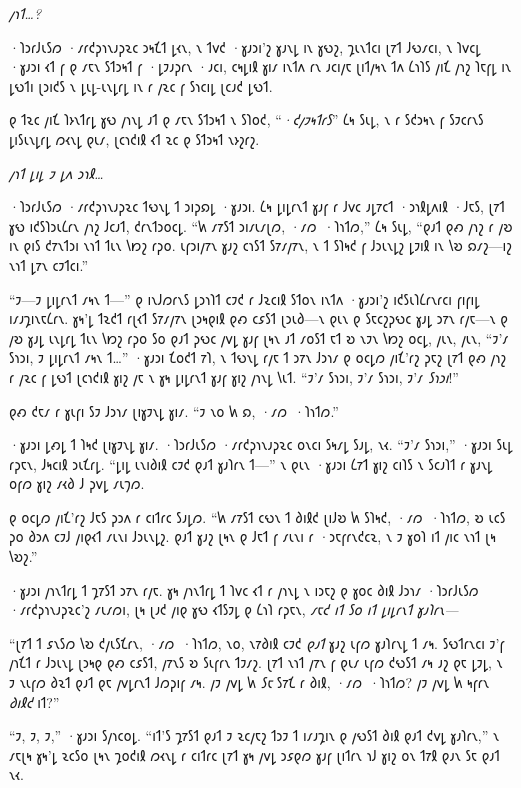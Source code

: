 \emph{𐑢𐑪𐑑…?}

·𐑐𐑮𐑩𐑓𐑧𐑕𐑼 ·𐑥𐑩𐑒𐑜𐑪𐑯𐑨𐑜𐑷𐑤 𐑮𐑰𐑗𐑑 𐑛𐑬𐑯, 𐑯 𐑑𐑫𐑒 ·𐑣𐑨𐑮𐑦'𐑟 𐑣𐑨𐑯𐑛 𐑦𐑯 𐑣𐑻𐑟, 𐑡𐑧𐑯𐑑𐑤𐑦 𐑚𐑳𐑑 𐑓𐑻𐑥𐑤𐑦, 𐑯 𐑐𐑫𐑤𐑛 ·𐑣𐑨𐑮𐑦 𐑬𐑑 𐑝 𐑞 𐑥𐑱𐑯 𐑕𐑑𐑮𐑰𐑑 𐑝 ·𐑛𐑲𐑨𐑜𐑩𐑯 ·𐑨𐑤𐑦, 𐑤𐑰𐑛𐑦𐑙 𐑣𐑦𐑥 𐑦𐑯𐑑𐑵 𐑩𐑯 𐑨𐑤𐑦𐑢𐑱 𐑚𐑦𐑑𐑢𐑰𐑯 𐑑𐑵 𐑖𐑪𐑐𐑕 𐑢𐑦𐑗 𐑢𐑪𐑟 𐑐𐑱𐑝𐑛 𐑦𐑯 𐑛𐑻𐑑𐑦 𐑚𐑮𐑦𐑒𐑕 𐑯 𐑛𐑧𐑛-𐑧𐑯𐑛𐑩𐑛 𐑦𐑯 𐑩 𐑢𐑷𐑤 𐑝 𐑕𐑪𐑤𐑦𐑛 𐑚𐑤𐑨𐑒 𐑛𐑻𐑑.

𐑞 𐑑𐑷𐑤 𐑢𐑦𐑗 𐑐𐑶𐑯𐑑𐑩𐑛 𐑣𐑻 𐑢𐑪𐑯𐑛 𐑨𐑑 𐑞 𐑥𐑱𐑯 𐑕𐑑𐑮𐑰𐑑 𐑯 𐑕𐑐𐑴𐑒, “\emph{·𐑒𐑢𐑲𐑰𐑑𐑩𐑕}” 𐑖𐑰 𐑕𐑧𐑛, 𐑯 𐑩 𐑕𐑒𐑮𐑰𐑯 𐑝 𐑕𐑲𐑤𐑩𐑯𐑕 𐑛𐑦𐑕𐑧𐑯𐑛𐑩𐑛 𐑼𐑬𐑯𐑛 𐑞𐑧𐑥, 𐑚𐑤𐑪𐑒𐑦𐑙 𐑬𐑑 𐑷𐑤 𐑞 𐑕𐑑𐑮𐑰𐑑 𐑯𐑶𐑟𐑩𐑟.

\emph{𐑢𐑪𐑑 𐑛𐑦𐑛 𐑲 𐑛𐑵 𐑮𐑪𐑙…}

·𐑐𐑮𐑩𐑓𐑧𐑕𐑼 ·𐑥𐑩𐑒𐑜𐑪𐑯𐑨𐑜𐑷𐑤 𐑑𐑻𐑯𐑛 𐑑 𐑮𐑦𐑜𐑸𐑛 ·𐑣𐑨𐑮𐑦. 𐑖𐑰 𐑛𐑦𐑛𐑩𐑯𐑑 𐑣𐑨𐑝 𐑩 𐑓𐑫𐑤 𐑨𐑛𐑳𐑤𐑑 ·𐑮𐑪𐑙𐑛𐑵𐑦𐑙 ·𐑓𐑱𐑕, 𐑚𐑳𐑑 𐑣𐑻 𐑦𐑒𐑕𐑐𐑮𐑧𐑖𐑩𐑯 𐑢𐑪𐑟 𐑓𐑤𐑨𐑑, 𐑒𐑩𐑯𐑑𐑮𐑴𐑤𐑛. “𐑿 𐑥𐑳𐑕𐑑 𐑮𐑦𐑥𐑧𐑥𐑚𐑼, ·𐑥𐑼~·𐑐𐑪𐑑𐑼,” 𐑖𐑰 𐑕𐑧𐑛, “𐑞𐑨𐑑 𐑞𐑺 𐑢𐑪𐑟 𐑩 𐑢𐑹 𐑦𐑯 𐑞𐑦𐑕 𐑒𐑳𐑯𐑑𐑮𐑦 𐑯𐑪𐑑 𐑑𐑧𐑯 𐑘𐑽𐑟 𐑩𐑜𐑴. 𐑧𐑝𐑮𐑦𐑢𐑳𐑯 𐑣𐑨𐑟 𐑤𐑪𐑕𐑑 𐑕𐑳𐑥𐑢𐑳𐑯, 𐑯 𐑑 𐑕𐑐𐑰𐑒 𐑝 𐑓𐑮𐑧𐑯𐑛𐑟 𐑛𐑲𐑦𐑙 𐑦𐑯 𐑘𐑹 𐑸𐑥𐑟—𐑦𐑟 𐑯𐑪𐑑 𐑛𐑳𐑯 𐑤𐑲𐑑𐑤𐑦.”

“𐑲—𐑲 𐑛𐑦𐑛𐑩𐑯𐑑 𐑥𐑰𐑯 𐑑—” 𐑞 𐑦𐑯𐑓𐑼𐑩𐑯𐑕 𐑛𐑮𐑪𐑐𐑑 𐑤𐑲𐑒 𐑩 𐑓𐑷𐑤𐑦𐑙 𐑕𐑑𐑴𐑯 𐑦𐑯𐑑𐑵 ·𐑣𐑨𐑮𐑦'𐑟 𐑦𐑒𐑕𐑧𐑐𐑖𐑩𐑯𐑩𐑤𐑦 𐑝𐑦𐑝𐑦𐑛 𐑦𐑥𐑨𐑡𐑦𐑯𐑱𐑖𐑩𐑯. 𐑣𐑰'𐑛 𐑑𐑷𐑒𐑑 𐑩𐑚𐑬𐑑 𐑕𐑳𐑥𐑢𐑳𐑯 𐑚𐑮𐑰𐑞𐑦𐑙 𐑞𐑺 𐑤𐑭𐑕𐑑 𐑚𐑮𐑧𐑔—𐑯 𐑞𐑧𐑯 𐑞 𐑕𐑱𐑤𐑟𐑜𐑻𐑤 𐑣𐑨𐑛 𐑮𐑳𐑯 𐑩𐑢𐑱—𐑯 𐑞 𐑢𐑹 𐑣𐑨𐑛 𐑧𐑯𐑛𐑩𐑛 𐑑𐑧𐑯 𐑘𐑽𐑟 𐑩𐑜𐑴 𐑕𐑴 𐑞𐑨𐑑 𐑜𐑻𐑤 𐑢𐑫𐑛 𐑣𐑨𐑝 𐑚𐑰𐑯 𐑨𐑑 𐑥𐑴𐑕𐑑 𐑱𐑑 𐑹 𐑯𐑲𐑯 𐑘𐑽𐑟 𐑴𐑤𐑛, 𐑢𐑧𐑯, 𐑢𐑧𐑯, “𐑲'𐑥 𐑕𐑪𐑮𐑦, 𐑲 𐑛𐑦𐑛𐑩𐑯𐑑 𐑥𐑰𐑯 𐑑…” ·𐑣𐑨𐑮𐑦 𐑗𐑴𐑒𐑑 𐑳𐑐, 𐑯 𐑑𐑻𐑯𐑛 𐑩𐑢𐑱 𐑑 𐑮𐑳𐑯 𐑓𐑮𐑪𐑥 𐑞 𐑴𐑤𐑛𐑼 𐑢𐑦𐑗'𐑩𐑟 𐑜𐑱𐑟 𐑚𐑳𐑑 𐑞𐑺 𐑢𐑪𐑟 𐑩 𐑢𐑷𐑤 𐑝 𐑛𐑻𐑑 𐑚𐑤𐑪𐑒𐑦𐑙 𐑣𐑦𐑟 𐑢𐑱 𐑯 𐑣𐑰 𐑛𐑦𐑛𐑩𐑯𐑑 𐑣𐑨𐑝 𐑣𐑦𐑟 𐑢𐑪𐑯𐑛 𐑘𐑧𐑑. “𐑲'𐑥 𐑕𐑪𐑮𐑦, 𐑲'𐑥 𐑕𐑪𐑮𐑦, 𐑲'𐑥 \emph{𐑕𐑪𐑮𐑦}!”

𐑞𐑺 𐑒𐑱𐑥 𐑩 𐑣𐑧𐑝𐑦 𐑕𐑲 𐑓𐑮𐑪𐑥 𐑚𐑦𐑣𐑲𐑯𐑛 𐑣𐑦𐑥. “𐑲 𐑯𐑴 𐑿 𐑸, ·𐑥𐑼~·𐑐𐑪𐑑𐑼.”

·𐑣𐑨𐑮𐑦 𐑛𐑺𐑛 𐑑 𐑐𐑰𐑒 𐑚𐑦𐑣𐑲𐑯𐑛 𐑣𐑦𐑥. ·𐑐𐑮𐑩𐑓𐑧𐑕𐑼 ·𐑥𐑩𐑒𐑜𐑪𐑯𐑨𐑜𐑷𐑤 𐑴𐑯𐑤𐑦 𐑕𐑰𐑥𐑛 𐑕𐑨𐑛, 𐑯𐑬. “𐑲'𐑥 𐑕𐑪𐑮𐑦,” ·𐑣𐑨𐑮𐑦 𐑕𐑧𐑛 𐑩𐑜𐑱𐑯, 𐑓𐑰𐑤𐑦𐑙 𐑮𐑧𐑗𐑩𐑛. “𐑛𐑦𐑛 𐑧𐑯𐑦𐑔𐑦𐑙 𐑤𐑲𐑒 𐑞𐑨𐑑 𐑣𐑨𐑐𐑩𐑯 𐑑—” 𐑯 𐑞𐑧𐑯 ·𐑣𐑨𐑮𐑦 𐑖𐑳𐑑 𐑣𐑦𐑟 𐑤𐑦𐑐𐑕 𐑯 𐑕𐑤𐑨𐑐𐑑 𐑩 𐑣𐑨𐑯𐑛 𐑴𐑝𐑼 𐑣𐑦𐑟 𐑥𐑬𐑔 𐑓 𐑜𐑫𐑛 𐑥𐑧𐑠𐑼.

𐑞 𐑴𐑤𐑛𐑼 𐑢𐑦𐑗'𐑩𐑟 𐑓𐑱𐑕 𐑜𐑮𐑵 𐑩 𐑤𐑦𐑑𐑩𐑤 𐑕𐑨𐑛𐑼. “𐑿 𐑥𐑳𐑕𐑑 𐑤𐑻𐑯 𐑑 𐑔𐑦𐑙𐑒 𐑚𐑦𐑓𐑹 𐑿 𐑕𐑐𐑰𐑒, ·𐑥𐑼~·𐑐𐑪𐑑𐑼, 𐑹 𐑧𐑤𐑕 𐑜𐑴 𐑔𐑮𐑵 𐑤𐑲𐑓 𐑢𐑦𐑞𐑬𐑑 𐑥𐑧𐑯𐑦 𐑓𐑮𐑧𐑯𐑛𐑟. 𐑞𐑨𐑑 𐑣𐑨𐑟 𐑚𐑰𐑯 𐑞 𐑓𐑱𐑑 𐑝 𐑥𐑧𐑯𐑦 𐑩 ·𐑮𐑱𐑝𐑩𐑯𐑒𐑤𐑷, 𐑯 𐑲 𐑣𐑴𐑐 𐑦𐑑 𐑢𐑦𐑤 𐑯𐑪𐑑 𐑚𐑰 𐑘𐑹𐑟.”

·𐑣𐑨𐑮𐑦 𐑢𐑪𐑯𐑑𐑩𐑛 𐑑 𐑡𐑳𐑕𐑑 𐑮𐑳𐑯 𐑩𐑢𐑱. 𐑣𐑰 𐑢𐑪𐑯𐑑𐑩𐑛 𐑑 𐑐𐑫𐑤 𐑬𐑑 𐑩 𐑢𐑪𐑯𐑛 𐑯 𐑦𐑮𐑱𐑟 𐑞 𐑣𐑴𐑤 𐑔𐑦𐑙 𐑓𐑮𐑪𐑥 ·𐑐𐑮𐑩𐑓𐑧𐑕𐑼 ·𐑥𐑩𐑒𐑜𐑪𐑯𐑨𐑜𐑷𐑤'𐑟 𐑥𐑧𐑥𐑼𐑦, 𐑚𐑰 𐑚𐑨𐑒 𐑢𐑦𐑞 𐑣𐑻 𐑬𐑑𐑕𐑲𐑛 𐑞 𐑖𐑪𐑐 𐑩𐑜𐑱𐑯, \emph{𐑥𐑱𐑒 𐑦𐑑 𐑕𐑴 𐑦𐑑 𐑛𐑦𐑛𐑩𐑯𐑑 𐑣𐑨𐑐𐑩𐑯—}

“𐑚𐑳𐑑 𐑑 𐑭𐑯𐑕𐑼 𐑘𐑹 𐑒𐑢𐑧𐑕𐑗𐑩𐑯, ·𐑥𐑼~·𐑐𐑪𐑑𐑼, 𐑯𐑴, 𐑯𐑳𐑔𐑦𐑙 𐑤𐑲𐑒 \emph{𐑞𐑨𐑑} 𐑣𐑨𐑟 𐑧𐑝𐑼 𐑣𐑨𐑐𐑩𐑯𐑛 𐑑 𐑥𐑰. 𐑕𐑻𐑑𐑩𐑯𐑤𐑦 𐑲'𐑝 𐑢𐑪𐑗𐑑 𐑩 𐑓𐑮𐑧𐑯𐑛 𐑚𐑮𐑰𐑞 𐑞𐑺 𐑤𐑭𐑕𐑑, 𐑢𐑳𐑯𐑕 𐑹 𐑕𐑧𐑝𐑩𐑯 𐑑𐑲𐑥𐑟. 𐑚𐑳𐑑 𐑯𐑪𐑑 𐑢𐑳𐑯 𐑝 𐑞𐑧𐑥 𐑧𐑝𐑼 𐑒𐑻𐑕𐑑 𐑥𐑰 𐑨𐑟 𐑞𐑱 𐑛𐑲𐑛, 𐑯 𐑲 𐑯𐑧𐑝𐑼 𐑔𐑷𐑑 𐑞𐑨𐑑 𐑞𐑱 𐑢𐑫𐑛𐑩𐑯𐑑 𐑓𐑼𐑜𐑦𐑝 𐑥𐑰. 𐑢𐑲 𐑢𐑫𐑛 𐑿 \emph{𐑕𐑱} 𐑕𐑳𐑗 𐑩 𐑔𐑦𐑙, ·𐑥𐑼~·𐑐𐑪𐑑𐑼? 𐑢𐑲 𐑢𐑫𐑛 𐑿 𐑰𐑝𐑩𐑯 \emph{𐑔𐑦𐑙𐑒} 𐑦𐑑?”

“𐑲, 𐑲, 𐑲,” ·𐑣𐑨𐑮𐑦 𐑕𐑢𐑪𐑤𐑴𐑛. “𐑦𐑑'𐑕 𐑡𐑳𐑕𐑑 𐑞𐑨𐑑 𐑲 𐑷𐑤𐑢𐑱𐑟 𐑑𐑮𐑲 𐑑 𐑦𐑥𐑨𐑡𐑦𐑯 𐑞 𐑢𐑻𐑕𐑑 𐑔𐑦𐑙 𐑞𐑨𐑑 𐑒𐑫𐑛 𐑣𐑨𐑐𐑩𐑯,” 𐑯 𐑥𐑱𐑚𐑰 𐑣𐑰'𐑛 𐑷𐑤𐑕𐑴 𐑚𐑰𐑯 𐑡𐑴𐑒𐑦𐑙 𐑼𐑬𐑯𐑛 𐑩 𐑤𐑦𐑑𐑩𐑤 𐑚𐑳𐑑 𐑣𐑰 𐑢𐑫𐑛 𐑮𐑭𐑞𐑼 𐑣𐑨𐑝 𐑚𐑦𐑑𐑩𐑯 𐑪𐑓 𐑣𐑦𐑟 𐑴𐑯 𐑑𐑳𐑙 𐑞𐑨𐑯 𐑕𐑱 𐑞𐑨𐑑 𐑯𐑬.


